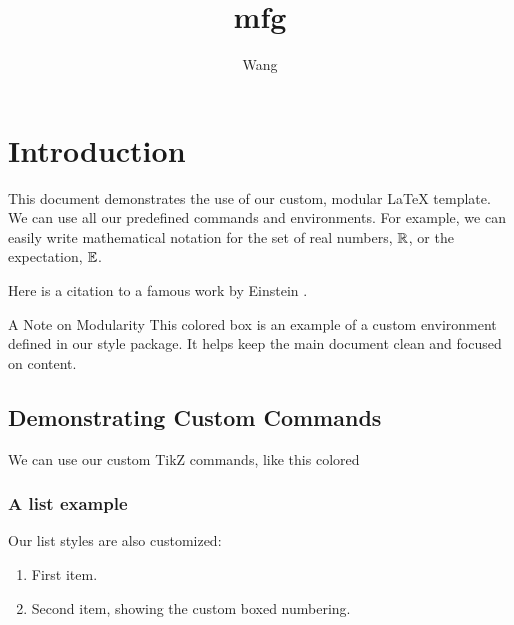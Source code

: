 \documentclass{e_class_thesis}
\begin{document}
\author{Wang}
\title{mfg}
\maketitle
\tableofcontents

\chapter{Introduction}

This document demonstrates the use of our custom, modular \LaTeX{} template. 
We can use all our predefined commands and environments. For example, we can easily write mathematical notation for the set of real numbers, $\mathbb{R}$, or the expectation, $\mathbb{E}$.

Here is a citation to a famous work by Einstein \cite{einstein1905}.

\begin{special_columns}{A Note on Modularity}
    This colored box is an example of a custom environment defined in our style package. It helps keep the main document clean and focused on content.
\end{special_columns}

\section{Demonstrating Custom Commands}

We can use our custom TikZ commands, like this colored 

\subsection{A list example}
Our list styles are also customized:
\begin{enumerate}
    \item First item.
    \item Second item, showing the custom boxed numbering.
\end{enumerate}
\end{document}
